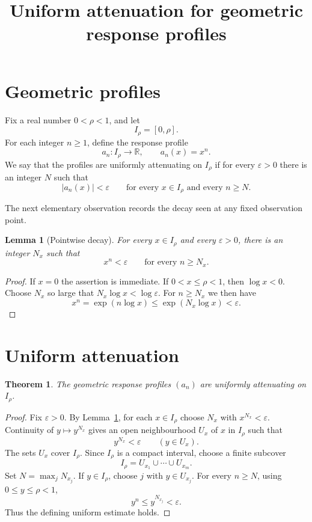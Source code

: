 \documentclass{article}
\title{Uniform attenuation for geometric response profiles}
\author{}
\date{}
\newtheorem{lemma}{Lemma}
\newtheorem{theorem}{Theorem}
\begin{document}
\maketitle

\section{Geometric profiles}

Fix a real number \(0<\rho<1\), and let
\[
I_\rho=[0,\rho].
\]
For each integer \(n\geq 1\), define the response profile
\[
a_n:I_\rho\to\mathbb R,\qquad a_n(x)=x^n.
\]
We say that the profiles are uniformly attenuating on \(I_\rho\) if for every
\(\varepsilon>0\) there is an integer \(N\) such that
\[
  |a_n(x)|<\varepsilon
  \qquad\text{for every }x\in I_\rho\text{ and every }n\geq N.
\]

The next elementary observation records the decay seen at any fixed
observation point.

\begin{lemma}[Pointwise decay]\label{lem:pointwise}
For every \(x\in I_\rho\) and every \(\varepsilon>0\), there is an integer
\(N_x\) such that
\[
  x^n<\varepsilon\qquad\text{for every }n\geq N_x.
\]
\end{lemma}

\begin{proof}
If \(x=0\) the assertion is immediate.  If \(0<x\leq\rho<1\), then
\(\log x<0\).  Choose \(N_x\) so large that \(N_x\log x<\log\varepsilon\).
For \(n\geq N_x\) we then have
\[
  x^n=\exp(n\log x)\leq \exp(N_x\log x)<\varepsilon.
\]
\end{proof}

\section{Uniform attenuation}

\begin{theorem}\label{thm:uniform-decay}
The geometric response profiles \((a_n)\) are uniformly attenuating on
\(I_\rho\).
\end{theorem}

\begin{proof}
Fix \(\varepsilon>0\).  By Lemma~\ref{lem:pointwise}, for each \(x\in I_\rho\)
choose \(N_x\) with \(x^{N_x}<\varepsilon\).  Continuity of
\(y\mapsto y^{N_x}\) gives an open neighbourhood \(U_x\) of \(x\) in
\(I_\rho\) such that
\[
  y^{N_x}<\varepsilon\qquad (y\in U_x).
\]
The sets \(U_x\) cover \(I_\rho\).  Since \(I_\rho\) is a compact interval,
choose a finite subcover
\[
  I_\rho=U_{x_1}\cup\cdots\cup U_{x_m}.
\]
Set \(N=\max_j N_{x_j}\).  If \(y\in I_\rho\), choose \(j\) with
\(y\in U_{x_j}\).  For every \(n\geq N\), using \(0\leq y\leq\rho<1\),
\[
  y^n\leq y^{N_{x_j}}<\varepsilon.
\]
Thus the defining uniform estimate holds.
\end{proof}
\end{document}
